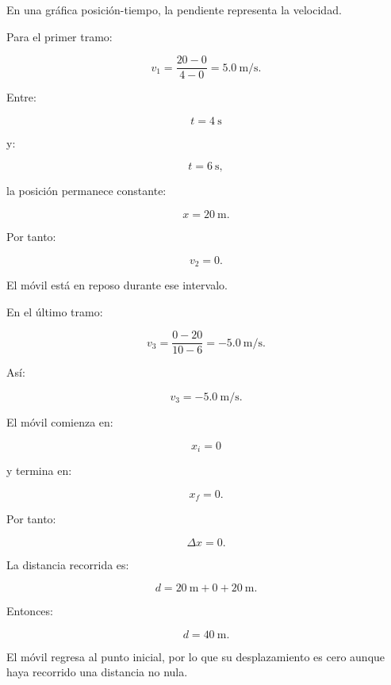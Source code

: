 \begin{explicacion}
En una gráfica posición-tiempo, la pendiente representa la velocidad.

Para el primer tramo:

\[
v_1
=
\frac{20-0}{4-0}
=
\boxed{\SI{5.0}{\meter\per\second}}.
\]

Entre:

\[
t=\SI{4}{\second}
\]

y:

\[
t=\SI{6}{\second},
\]

la posición permanece constante:

\[ x=\SI{20}{\meter}. \]

Por tanto:

\[ \boxed{v_2=0}. \]

El móvil está en reposo durante ese intervalo.

En el último tramo:

\[
v_3
=
\frac{0-20}{10-6}
=
-\SI{5.0}{\meter\per\second}.
\]

Así:

\[ \boxed{v_3=-\SI{5.0}{\meter\per\second}}. \]

El móvil comienza en:

\[ x_i=0 \]

y termina en:

\[ x_f=0. \]

Por tanto:

\[ \boxed{\Delta x=0}. \]

La distancia recorrida es:

\[
d
=
\SI{20}{\meter}
+
0
+
\SI{20}{\meter}.
\]

Entonces:

\[ \boxed{d=\SI{40}{\meter}}. \]

El móvil regresa al punto inicial, por lo que su desplazamiento es cero aunque haya recorrido una distancia no nula.
\end{explicacion}



